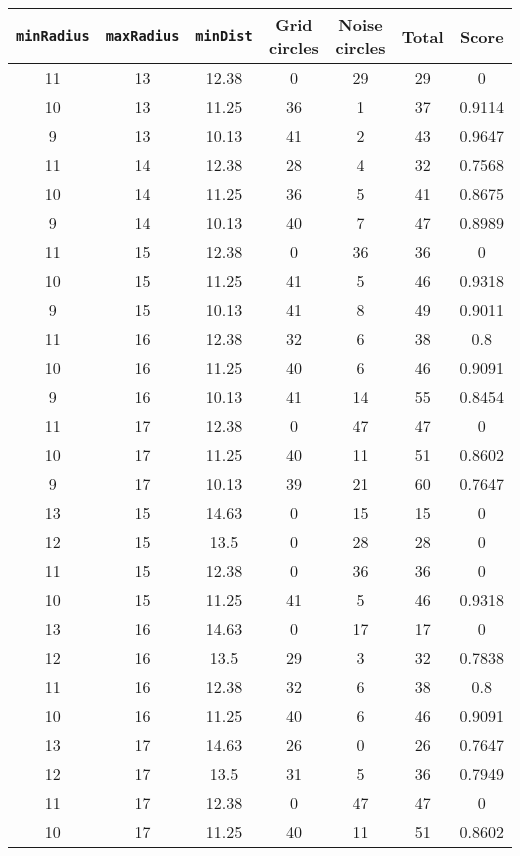 \documentclass[letterpaper, 12pt]{article}
\begin{document}
\begin{longtable}{|c|c|c|c|c|c|c|}
\hline
\textbf{\texttt{minRadius}} & \textbf{\texttt{maxRadius}} & \textbf{\texttt{minDist}} & \textbf{Grid circles} & \textbf{Noise circles} & \textbf{Total} & \textbf{Score} \\
\hline
11 & 13 & 12.38 & 0 & 29 & 29 & 0 \\
\hline
10 & 13 & 11.25 & 36 & 1 & 37 & 0.9114 \\
\hline
9 & 13 & 10.13 & 41 & 2 & 43 & 0.9647 \\
\hline
11 & 14 & 12.38 & 28 & 4 & 32 & 0.7568 \\
\hline
10 & 14 & 11.25 & 36 & 5 & 41 & 0.8675 \\
\hline
9 & 14 & 10.13 & 40 & 7 & 47 & 0.8989 \\
\hline
11 & 15 & 12.38 & 0 & 36 & 36 & 0 \\
\hline
10 & 15 & 11.25 & 41 & 5 & 46 & 0.9318 \\
\hline
9 & 15 & 10.13 & 41 & 8 & 49 & 0.9011 \\
\hline
11 & 16 & 12.38 & 32 & 6 & 38 & 0.8 \\
\hline
10 & 16 & 11.25 & 40 & 6 & 46 & 0.9091 \\
\hline
9 & 16 & 10.13 & 41 & 14 & 55 & 0.8454 \\
\hline
11 & 17 & 12.38 & 0 & 47 & 47 & 0 \\
\hline
10 & 17 & 11.25 & 40 & 11 & 51 & 0.8602 \\
\hline
9 & 17 & 10.13 & 39 & 21 & 60 & 0.7647 \\
\hline
13 & 15 & 14.63 & 0 & 15 & 15 & 0 \\
\hline
12 & 15 & 13.5 & 0 & 28 & 28 & 0 \\
\hline
11 & 15 & 12.38 & 0 & 36 & 36 & 0 \\
\hline
10 & 15 & 11.25 & 41 & 5 & 46 & 0.9318 \\
\hline
13 & 16 & 14.63 & 0 & 17 & 17 & 0 \\
\hline
12 & 16 & 13.5 & 29 & 3 & 32 & 0.7838 \\
\hline
11 & 16 & 12.38 & 32 & 6 & 38 & 0.8 \\
\hline
10 & 16 & 11.25 & 40 & 6 & 46 & 0.9091 \\
\hline
13 & 17 & 14.63 & 26 & 0 & 26 & 0.7647 \\
\hline
12 & 17 & 13.5 & 31 & 5 & 36 & 0.7949 \\
\hline
11 & 17 & 12.38 & 0 & 47 & 47 & 0 \\
\hline
10 & 17 & 11.25 & 40 & 11 & 51 & 0.8602 \\

\end{longtable}
\end{document}
